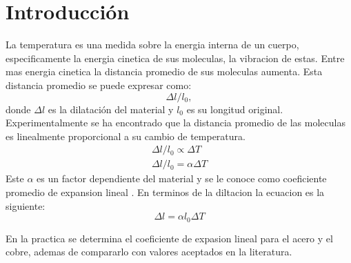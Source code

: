 \section*{Introducción}
La temperatura es una medida sobre la energia interna de un cuerpo, especificamente la energia cinetica de sus moleculas, la vibracion de estas. Entre mas energia cinetica la distancia promedio de sus moleculas aumenta. Esta distancia promedio se puede expresar como:
\[
	\Delta l/l_0,
\]
donde $\Delta l$ es la dilataci\'on del material y $l_0$ es su longitud original. Experimentalmente se ha encontrado que la distancia promedio de las moleculas es linealmente proporcional a su cambio de temperatura.
\begin{align*}
	\Delta l/l_0 \propto \Delta T \\
	\Delta l/l_0 = \alpha \Delta T 
\end{align*}
Este $\alpha$ es un factor dependiente del material y se le conoce como coeficiente promedio de expansion lineal \cite{constantes}.
En terminos de la diltacion la ecuacion es la siguiente:
\begin{equation}
	\label{eq:dilatacion}
	\Delta l = \alpha l_0 \Delta T
\end{equation}

En la practica se determina el coeficiente de expasion lineal para el acero y el cobre, ademas de compararlo con valores aceptados en la literatura.
